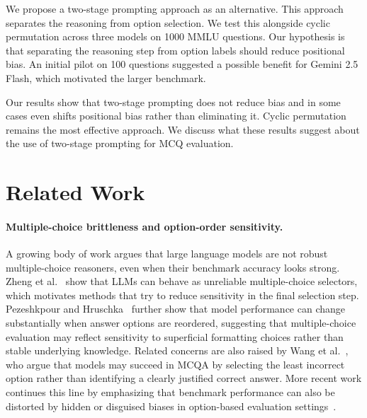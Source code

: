 \documentclass{article}
\begin{document}
We propose a two-stage prompting approach as an alternative. This approach separates the reasoning from option selection. We test this alongside cyclic permutation across three models on 1000 MMLU questions. Our hypothesis is that separating the reasoning step from option labels should reduce positional bias. An initial pilot on 100 questions suggested a possible benefit for Gemini 2.5 Flash, which motivated the larger benchmark.
 
Our results show that two-stage prompting does not reduce bias and in some cases even shifts positional bias rather than eliminating it. Cyclic permutation remains the most effective approach. We discuss what these results suggest about the use of two-stage prompting for MCQ evaluation.
 
\section{Related Work}
 
\paragraph{Multiple-choice brittleness and option-order sensitivity.}
A growing body of work argues that large language models are not robust multiple-choice reasoners, even when their benchmark accuracy looks strong. Zheng et al.~\cite{zheng2023large} show that LLMs can behave as unreliable multiple-choice selectors, which motivates methods that try to reduce sensitivity in the final selection step. Pezeshkpour and Hruschka~\cite{pezeshkpour-hruschka-2024-large} further show that model performance can change substantially when answer options are reordered, suggesting that multiple-choice evaluation may reflect sensitivity to superficial formatting choices rather than stable underlying knowledge. Related concerns are also raised by Wang et al.~\cite{wang2024llms}, who argue that models may succeed in MCQA by selecting the least incorrect option rather than identifying a clearly justified correct answer. More recent work continues this line by emphasizing that benchmark performance can also be distorted by hidden or disguised biases in option-based evaluation settings~\cite{nowak2026abcd}.
 
\end{document}
